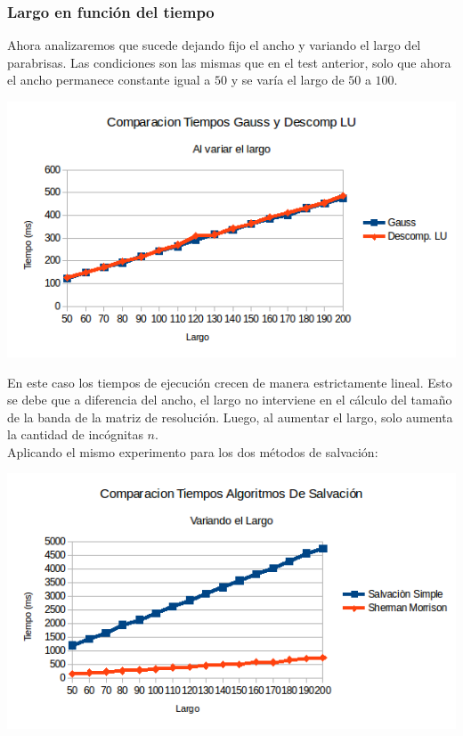 \subsubsection{Largo en función del tiempo}
Ahora analizaremos que sucede dejando fijo el ancho y variando el largo del parabrisas. Las condiciones son las mismas que en el test anterior, solo que ahora el ancho permanece constante igual a $50$ y se varía el largo de $50$ a $100$.

\begin{center}
 \includegraphics[width=400pt]{imagenes/testeo/largoGauss.png}
\end{center}

En este caso los tiempos de ejecución crecen de manera estrictamente lineal. Esto se debe que a diferencia del ancho, el largo no interviene en el cálculo del tamaño de la banda de la matriz de resolución. Luego, al aumentar el largo, solo aumenta la cantidad de incógnitas $n$.
\\
Aplicando el mismo experimento para los dos métodos de salvación:

\begin{center}
 \includegraphics[width=400pt]{imagenes/testeo/largoSalv.png}
\end{center}

